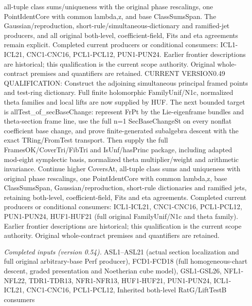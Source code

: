 \documentclass[11pt,a4paper]{article}
\numberwithin{equation}{section}
\theoremstyle{remark}\newtheorem{remark}[theorem]{Remark}
\begin{document}
all-tuple class sums/uniqueness with the original phase rescalings, one PointIdentCore with common lambda,z, and base ClassSumsSpan. The Gaussian/reproduction, short-rule/simultaneous-dictionary and ramified-jet producers, and all original both-level, coefficient-field, Fits and eta agreements remain explicit. Completed current producers or conditional consumers: ICL1-ICL21, CNC1-CNC16, PCL1-PCL12, PUN1-PUN24. Earlier frontier descriptions are historical; this qualification is the current scope authority. Original whole-contract premises and quantifiers are retained. CURRENT VERSION0.49 QUALIFICATION: Construct the adjoining simultaneous principal framed points and test-ring dictionary. Full finite holomorphic FamilyUnif/N1c, normalized theta families and local lifts are now supplied by HUF. The next bounded target is allTest\_\allowbreak of\_\allowbreak secBaseChange: represent FrPt by the Lie-eigenframe bundles and theta-section frame line, use the full n=1 SecBaseChangeSt on every nonflat coefficient base change, and prove finite-generated subalgebra descent with the exact TRing/FromTest transport. Then supply the full FramesOK/CoverTri/FibTri and IsUnf/hasPrinc package, including adapted mod-eight symplectic basis, normalized theta multiplier/weight and arithmetic invariance. Continue higher CoversAt, all-tuple class sums and uniqueness with original phase rescalings, one PointIdentCore with common lambda,z, base ClassSumsSpan, Gaussian/reproduction, short-rule dictionaries and ramified jets, retaining both-level, coefficient-field, Fits and eta agreements. Completed current producers or conditional consumers: ICL1-ICL21, CNC1-CNC16, PCL1-PCL12, PUN1-PUN24, HUF1-HUF21 (full original FamilyUnif/N1c and theta family). Earlier frontier descriptions are historical; this qualification is the current scope authority. Original whole-contract premises and quantifiers are retained.

\emph{Completed inputs (version 0.54).} ASL1–ASL21 (actual section localization and full original arbitrary-base Perf producer), FCD1-FCD18 (full homogeneous-chart descent, graded presentation and Noetherian cube model), GSL1-GSL26, NFL1-NFL22, TDR1-TDR13, NFR1-NFR13, HUF1-HUF21, PUN1-PUN24, ICL1-ICL21, CNC1-CNC16, PCL1-PCL12, Inherited both-level RatG/LiftTestB consumers
\end{document}
